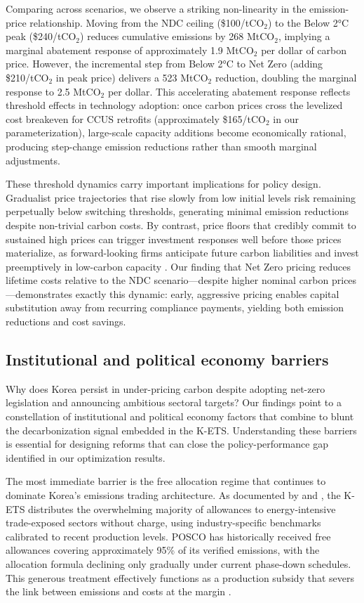 \documentclass[preprint,1p,authoryear]{elsarticle}
\begin{document}
Comparing across scenarios, we observe a striking non-linearity in the emission-price relationship. Moving from the NDC ceiling (\$100/tCO$_2$) to the Below 2°C peak (\$240/tCO$_2$) reduces cumulative emissions by 268 MtCO$_2$, implying a marginal abatement response of approximately 1.9 MtCO$_2$ per dollar of carbon price. However, the incremental step from Below 2°C to Net Zero (adding \$210/tCO$_2$ in peak price) delivers a 523 MtCO$_2$ reduction, doubling the marginal response to 2.5 MtCO$_2$ per dollar. This accelerating abatement response reflects threshold effects in technology adoption: once carbon prices cross the levelized cost breakeven for CCUS retrofits (approximately \$165/tCO$_2$ in our parameterization), large-scale capacity additions become economically rational, producing step-change emission reductions rather than smooth marginal adjustments.

These threshold dynamics carry important implications for policy design. Gradualist price trajectories that rise slowly from low initial levels risk remaining perpetually below switching thresholds, generating minimal emission reductions despite non-trivial carbon costs. By contrast, price floors that credibly commit to sustained high prices can trigger investment responses well before those prices materialize, as forward-looking firms anticipate future carbon liabilities and invest preemptively in low-carbon capacity \citep{fowlie2016carbon}. Our finding that Net Zero pricing reduces lifetime costs relative to the NDC scenario—despite higher nominal carbon prices—demonstrates exactly this dynamic: early, aggressive pricing enables capital substitution away from recurring compliance payments, yielding both emission reductions and cost savings.

\subsection{Institutional and political economy barriers}

Why does Korea persist in under-pricing carbon despite adopting net-zero legislation and announcing ambitious sectoral targets? Our findings point to a constellation of institutional and political economy factors that combine to blunt the decarbonization signal embedded in the K-ETS. Understanding these barriers is essential for designing reforms that can close the policy-performance gap identified in our optimization results.

The most immediate barrier is the free allocation regime that continues to dominate Korea's emissions trading architecture. As documented by \citet{kim2021kets} and \citet{ICAP2024}, the K-ETS distributes the overwhelming majority of allowances to energy-intensive trade-exposed sectors without charge, using industry-specific benchmarks calibrated to recent production levels. POSCO has historically received free allowances covering approximately 95\% of its verified emissions, with the allocation formula declining only gradually under current phase-down schedules. This generous treatment effectively functions as a production subsidy that severs the link between emissions and costs at the margin \citep{sartor2012benchmark}.
\end{document}
